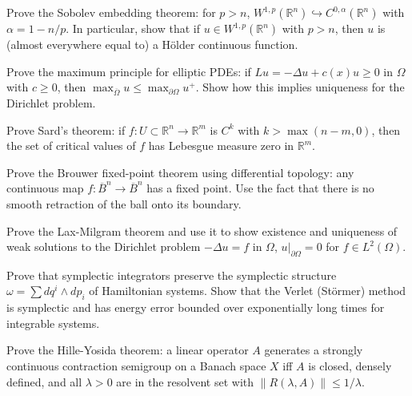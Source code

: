 \documentclass[12pt,a4paper]{exam}
\begin{document}
\begin{questions}
\vspace{0.3cm}

\question[5]
Prove the Sobolev embedding theorem: for $p > n$, $W^{1,p}(\mathbb{R}^n) \hookrightarrow C^{0,\alpha}(\mathbb{R}^n)$ with $\alpha = 1 - n/p$. In particular, show that if $u \in W^{1,p}(\mathbb{R}^n)$ with $p > n$, then $u$ is (almost everywhere equal to) a H\"older continuous function.

\vspace{0.3cm}

\question[2]
Prove the maximum principle for elliptic PDEs: if $Lu = -\Delta u + c(x) u \geq 0$ in $\Omega$ with $c \geq 0$, then $\max_{\overline{\Omega}} u \leq \max_{\partial\Omega} u^+$. Show how this implies uniqueness for the Dirichlet problem.

\vspace{0.3cm}

\question[3]
Prove Sard's theorem: if $f: U \subset \mathbb{R}^n \to \mathbb{R}^m$ is $C^k$ with $k > \max(n-m, 0)$, then the set of critical values of $f$ has Lebesgue measure zero in $\mathbb{R}^m$.

\vspace{0.3cm}

\question[5]
Prove the Brouwer fixed-point theorem using differential topology: any continuous map $f: \overline{B}^n \to \overline{B}^n$ has a fixed point. Use the fact that there is no smooth retraction of the ball onto its boundary.

\vspace{0.3cm}

\question[4]
Prove the Lax-Milgram theorem and use it to show existence and uniqueness of weak solutions to the Dirichlet problem $-\Delta u = f$ in $\Omega$, $u|_{\partial\Omega} = 0$ for $f \in L^2(\Omega)$.

\vspace{0.3cm}

\question[4]
Prove that symplectic integrators preserve the symplectic structure $\omega = \sum dq^i \wedge dp_i$ of Hamiltonian systems. Show that the Verlet (St\"ormer) method is symplectic and has energy error bounded over exponentially long times for integrable systems.

\vspace{0.3cm}

\question[5]
Prove the Hille-Yosida theorem: a linear operator $A$ generates a strongly continuous contraction semigroup on a Banach space $X$ iff $A$ is closed, densely defined, and all $\lambda > 0$ are in the resolvent set with $\|R(\lambda,A)\| \leq 1/\lambda$.


\end{questions}
\end{document}
